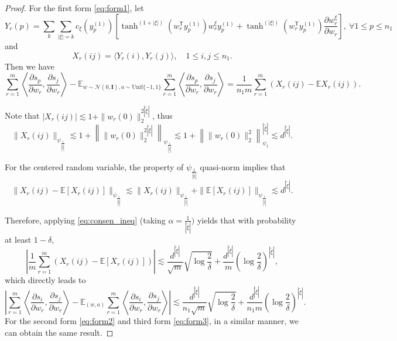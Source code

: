 \documentclass{article}
\newcommand{\T}{\mathsf{T}}
\begin{document}
\begin{proof}
For the first form \cref{eq:form1}, let
\begin{equation*}
Y_r(p) = \sum_{k}\sum_{|\xi|=k}c_{\xi}(y_p^{(1)})\left[\tanh^{(1+|\xi|)}(w_r^\T y_p^{(1)})w_r^{\xi}y_p^{(1)}+\tanh^{(|\xi|)}(w_r^\T y_p^{(1)})\frac{\partial w_r^\xi}{\partial w_r}\right], \ \forall 1\le p\le n_1
\end{equation*}
and
\begin{equation*}
    X_r(ij) = \langle Y_r(i), Y_r(j) \rangle, \quad 1\le i, j\le n_1 .
\end{equation*}
Then we have
\begin{equation*}
    \sum_{r=1}^m \left\langle \frac{\partial s_p}{\partial w_r}, \frac{\partial s_j}{\partial w_r} \right\rangle - \mathbb{E}_{w\sim\mathcal{N}(0,\mathbf{I}), a\sim \text{Unif}\{-1,1\}} \sum_{r=1}^m \left\langle \frac{\partial s_p}{\partial w_r}, \frac{\partial s_j}{\partial w_r} \right\rangle = \frac{1}{n_1 m}\sum_{r=1}^m \left(X_r(ij) - \mathbb{E} X_r(ij)\right).
\end{equation*}

Note that \( |X_r(ij)| \lesssim 1 + \|w_r(0)\|_2^{2|\tilde{\xi}|} \), thus
\begin{equation*}
    \|X_r(ij)\|_{\psi_{\frac{1}{|\tilde{\xi}|}}} \lesssim 1 + \left\|\|w_r(0)\|_{2}^{2|\tilde{\xi}|}\right\|_{\psi_{\frac{1}{|\tilde{\xi}|}}}  \lesssim 1 + \left\|\|w_r(0)\|_{2}^{2}\right\|_{\psi_{1}}^{|\tilde{\xi}|}   \lesssim d^{|\tilde{\xi}|}.
\end{equation*}

For the centered random variable, the property of \(\psi_{\frac{1}{|\tilde{\xi}|}}\) quasi-norm implies that
\begin{equation*}
\| X_r(ij) - \mathbb{E}[X_r(ij)] \|_{\psi_{\frac{1}{|\tilde{\xi}|}}} \lesssim \|X_r(ij)\|_{\psi_{\frac{1}{|\tilde{\xi}|}}} + \|\mathbb{E}[X_r(ij)]\|_{\psi_{\frac{1}{|\tilde{\xi}|}}}\lesssim d^{|\tilde{\xi}|}.
\end{equation*}

Therefore, applying \cref{eq:consen_ineq} (taking $\alpha=\frac{1}{|\tilde{\xi}|})$ yields that with probability at least \(1-\delta\),
\begin{equation*}
    \left| \frac{1}{m}\sum_{r=1}^m ( X_r(ij) - \mathbb{E}[X_r(ij)] ) \right| \lesssim \frac{d^{|\tilde{\xi}|}}{\sqrt{m}} \sqrt{\log\frac{2}{\delta}} + \frac{d^{|\tilde{\xi}|}}{m}\left(\log\frac{2}{\delta}\right)^{|\tilde{\xi}|},
\end{equation*}
which directly leads to
\begin{equation*}
    \left| \sum_{r=1}^m \left\langle \frac{\partial s_i}{\partial w_r}, \frac{\partial s_j}{\partial w_r} \right\rangle - \mathbb{E}_(w,a) \sum_{r=1}^m \left\langle \frac{\partial s_i}{\partial w_r}, \frac{\partial s_j}{\partial w_r} \right\rangle \right| \lesssim \frac{d^{|\tilde{\xi}|}}{n_1 \sqrt{m}} \sqrt{\log\frac{2}{\delta}} + \frac{d^{|\tilde{\xi}|}}{n_1 m}\left(\log\frac{2}{\delta}\right)^{|\tilde{\xi}|}.
\end{equation*}   
For the second form \cref{eq:form2} and third form \cref{eq:form3}, in a similar manner, we can obtain the same result.


\end{proof}
\end{document}
